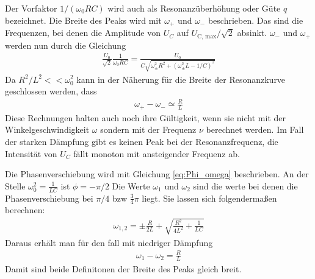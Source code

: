 Der Vorfaktor $1/(\omega_0 RC)$ wird auch als Resonanzüberhöhung oder Güte $q$ bezeichnet.
Die Breite des Peaks wird mit $\omega_+$ und $\omega_-$ beschrieben.
Das sind die Frequenzen, bei denen die Amplitude von $U_C$ auf $U_\text{C, max}/\sqrt{2}$ absinkt.
$\omega_-$ und $\omega_+$ werden nun durch die Gleichung
\begin{align*}
    \frac{U_0}{\sqrt{2}} \frac{1}{\omega_0 RC} = \frac{U_0}{C\sqrt{\omega_\pm^2 R^2 + \left(\omega_\pm^2 L - 1/C\right)^2}}
\end{align*}
Da $R^2/ L^2 << \omega_0^2$ kann in der Näherung für die Breite der Resonanzkurve geschlossen werden, dass
\begin{align}
    \omega_+ - \omega_- \simeq \frac{R}{L}
    \label{eq:omega_Breite_pm}
\end{align}
Diese Rechnungen halten auch noch ihre Gültigkeit, 
wenn sie nicht mit der Winkelgeschwindigkeit $\omega$ sondern mit der Frequenz $\nu$ berechnet werden.
Im Fall der starken Dämpfung gibt es keinen Peak bei der Resonanzfrequenz, 
die Intensität von $U_C$ fällt monoton mit ansteigender Frequenz ab.

Die Phasenverschiebung wird mit Gleichung \eqref{eq:Phi_omega} beschrieben.
An der Stelle $\omega_0^2 = \frac{1}{LC}$ ist $\phi = -\pi/2$
Die Werte $\omega_1$ und $\omega_2$ sind die werte bei denen die Phasenverschiebung bei $\pi/4$ bzw $\frac{3}{4}\pi$ liegt.
Sie lassen sich folgendermaßen berechnen:
\begin{align}
    \omega_{1,2} = \pm \frac{R}{2L} + \sqrt{\frac{R^2}{4L^2} + \frac{1}{LC}}
    \label{eq:omega12}
\end{align}
Daraus erhält man für den fall mit niedriger Dämpfung
\begin{align}
    \omega_1 -\omega_2 = \frac{R}{L}
    \label{eq:omega_Breite_12}
\end{align}
Damit sind beide Definitonen der Breite des Peaks gleich breit.